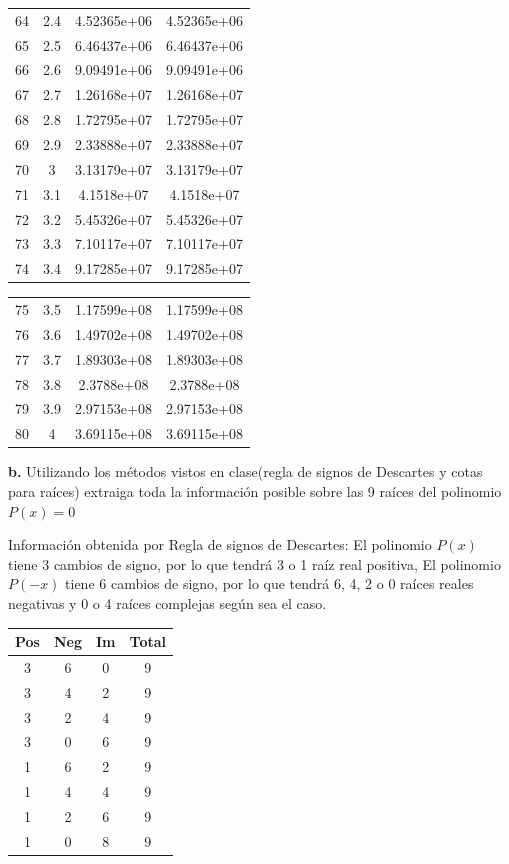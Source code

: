 \documentclass{article} %
\begin{document}
\begin{center}
\begin{tabular}{|c|c|c|c|}
64 & 2.4 & 4.52365e+06 & 4.52365e+06\\
65 & 2.5 & 6.46437e+06 & 6.46437e+06\\
66 & 2.6 & 9.09491e+06 & 9.09491e+06\\
67 & 2.7 & 1.26168e+07 & 1.26168e+07\\
68 & 2.8 & 1.72795e+07 & 1.72795e+07\\
69 & 2.9 & 2.33888e+07 & 2.33888e+07\\
70 & 3 & 3.13179e+07 & 3.13179e+07\\
71 & 3.1 & 4.1518e+07 & 4.1518e+07\\
72 & 3.2 & 5.45326e+07 & 5.45326e+07\\
73 & 3.3 & 7.10117e+07 & 7.10117e+07\\
74 & 3.4 & 9.17285e+07 & 9.17285e+07\\
\end{tabular}
\end{center}

\begin{center}
\begin{tabular}{|c|c|c|c|}
75 & 3.5 & 1.17599e+08 & 1.17599e+08\\
76 & 3.6 & 1.49702e+08 & 1.49702e+08\\
77 & 3.7 & 1.89303e+08 & 1.89303e+08\\
78 & 3.8 & 2.3788e+08 & 2.3788e+08\\
79 & 3.9 & 2.97153e+08 & 2.97153e+08\\
80 & 4 & 3.69115e+08 & 3.69115e+08\\
\hline
\end{tabular}
\end{center}

\textbf{b.} Utilizando los métodos vistos en clase(regla de signos de Descartes y cotas para raíces) extraiga toda la información posible sobre las 9 raíces del polinomio $P(x)=0$

Información obtenida por Regla de signos de Descartes: El polinomio $P(x)$ tiene 3 cambios de signo, por lo que tendrá 3 o 1 raíz real positiva, El polinomio $P(-x)$ tiene 6 cambios de signo, por lo que tendrá 6, 4, 2 o 0 raíces reales negativas y 0 o 4 raíces complejas según sea el caso.

\begin{center}
\begin{tabular}{|c|c|c|c|}
\hline
Pos & Neg & Im & Total \\
\hline
3 & 6 & 0 & 9\\
\hline
3 & 4 & 2 & 9\\
\hline
3 & 2 & 4 & 9\\
\hline
3 & 0 & 6 & 9\\
\hline
1 & 6 & 2 & 9\\
\hline
1 & 4 & 4 & 9\\
\hline
1 & 2 & 6 & 9\\
\hline
1 & 0 & 8 & 9\\
\hline
\end{tabular}
\end{center}
\end{document}
